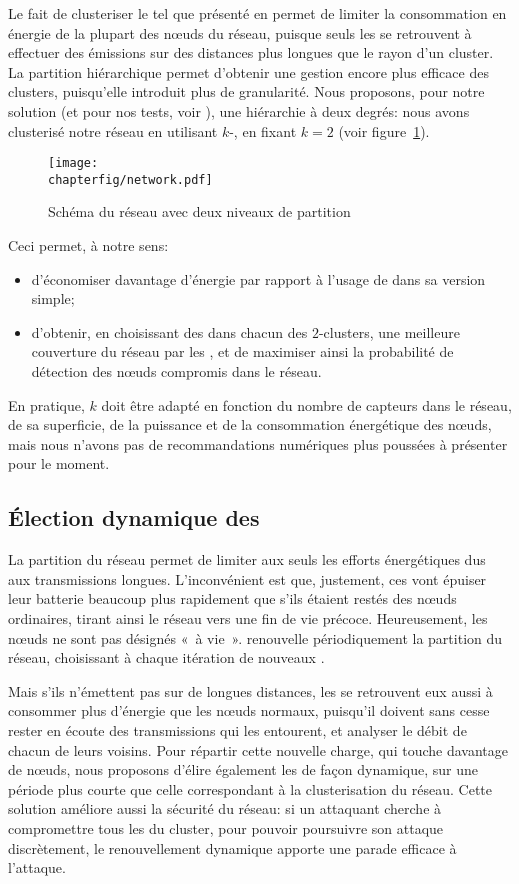 Le fait de clusteriser le \rc tel que présenté en  permet de limiter la consommation en énergie de la plupart des nœuds du réseau, puisque seuls les \chs se retrouvent à effectuer des émissions sur des distances plus longues que le rayon d'un cluster.
La partition hiérarchique permet d'obtenir une gestion encore plus efficace des clusters, puisqu'elle introduit plus de granularité.
Nous proposons, pour notre solution (et pour nos tests, voir ), une hiérarchie à deux degrés: nous avons clusterisé notre réseau en utilisant $k$-\leach, en fixant $k=2$ (voir figure~\ref{sa:fig:network}).
\begin{figure}[ht]
    \centering
    \texttt{[image: \\chapterfig/network.pdf]}
    \caption{Schéma du réseau avec deux niveaux de partition}\label{sa:fig:network}
\end{figure}
Ceci permet, à notre sens:
\begin{itemize}
    \item d'économiser davantage d'énergie par rapport à l'usage de \leach dans sa version simple;
    \item d'obtenir, en choisissant des \cns dans chacun des $2$-clusters, une meilleure couverture du réseau par les \cns, et de maximiser ainsi la probabilité de détection des nœuds compromis dans le réseau.
\end{itemize}
En pratique, $k$ doit être adapté en fonction du nombre de capteurs dans le réseau, de sa superficie, de la puissance et de la consommation énergétique des nœuds, mais nous n'avons pas de recommandations numériques plus poussées à présenter pour le moment.

    \subsection{Élection dynamique des \cns}

La partition du réseau permet de limiter aux seuls \chs les efforts énergétiques dus aux transmissions longues.
L'inconvénient est que, justement, ces \CH vont épuiser leur batterie beaucoup plus rapidement que s'ils étaient restés des nœuds ordinaires, tirant ainsi le réseau vers une fin de vie précoce.
Heureusement, les nœuds ne sont pas désignés \CH «~à vie~».
\leach renouvelle périodiquement la partition du réseau, choisissant à chaque itération de nouveaux \chs.

Mais s'ils n'émettent pas sur de longues distances, les \cns se retrouvent eux aussi à consommer plus d'énergie que les nœuds normaux, puisqu'il doivent sans cesse rester en écoute des transmissions qui les entourent, et analyser le débit de chacun de leurs voisins.
Pour répartir cette nouvelle charge, qui touche davantage de nœuds, nous proposons d'élire également les \cns de façon dynamique, sur une période plus courte que celle correspondant à la clusterisation du réseau.
Cette solution améliore aussi la sécurité du réseau: si un attaquant cherche à compromettre tous les \cns du cluster, pour pouvoir poursuivre son attaque discrètement, le renouvellement dynamique apporte une parade efficace à l'attaque.

